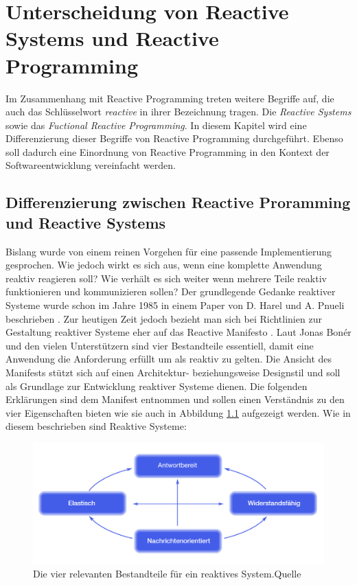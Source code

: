 \chapter{Unterscheidung von Reactive Systems und Reactive Programming}\label{abgrenzung}
Im Zusammenhang mit Reactive Programming treten weitere Begriffe auf, die auch das Schlüsselwort \textit{reactive} in ihrer Bezeichnung tragen. Die \textit{Reactive Systems} sowie das \textit{Fuctional Reactive Programming}. In diesem Kapitel wird eine Differenzierung dieser Begriffe von Reactive Programming durchgeführt. Ebenso soll dadurch eine Einordnung von Reactive Programming in den Kontext der Softwareentwicklung vereinfacht werden.
\section{Differenzierung zwischen Reactive Proramming und Reactive Systems}
Bislang wurde von einem reinen Vorgehen für eine passende Implementierung gesprochen. Wie jedoch wirkt es sich aus, wenn eine komplette Anwendung reaktiv reagieren soll? Wie verhält es sich weiter wenn mehrere Teile reaktiv funktionieren und kommunizieren sollen? Der grundlegende Gedanke reaktiver Systeme wurde schon im Jahre 1985 in einem Paper von D. Harel und A. Pnueli beschrieben \cite{Harel.1985}. Zur heutigen Zeit jedoch bezieht man sich bei Richtlinien zur Gestaltung reaktiver Systeme eher auf das Reactive Manifesto \cite{Boner.2014}. Laut Jonas Bonér und den vielen Unterstützern sind vier Bestandteile essentiell, damit eine Anwendung die Anforderung erfüllt um als reaktiv zu gelten. Die Ansicht des Manifests stützt sich auf einen Architektur- beziehungsweise Designstil und soll als Grundlage zur Entwicklung reaktiver Systeme dienen. Die folgenden Erklärungen sind dem Manifest entnommen und sollen einen Verständnis zu den vier Eigenschaften bieten wie sie auch in Abbildung \ref{pic:manifest4} aufgezeigt werden. \newpage Wie in diesem beschrieben sind Reaktive Systeme:
\begin{figure}[hbt]
	\centering
	\includegraphics[width=1\textwidth]{Abb/manifest4achsen.PNG}
	\caption{Die vier relevanten Bestandteile für ein reaktives System.Quelle \cite{Boner.2014}}
	\label{pic:manifest4}
\end{figure}
